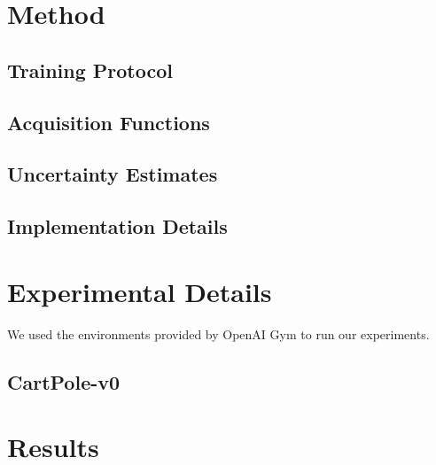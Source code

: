 \documentclass[11pt, a4paper, bibliography=totoc]{report}
\begin{document}
\chapter{Method}
\section{Training Protocol}

\section{Acquisition Functions}

\section{Uncertainty Estimates}

\section{Implementation Details}

\chapter{Experimental Details}
We used the environments provided by OpenAI Gym to run our experiments.

\section{CartPole-v0}

\chapter{Results}
\end{document}
